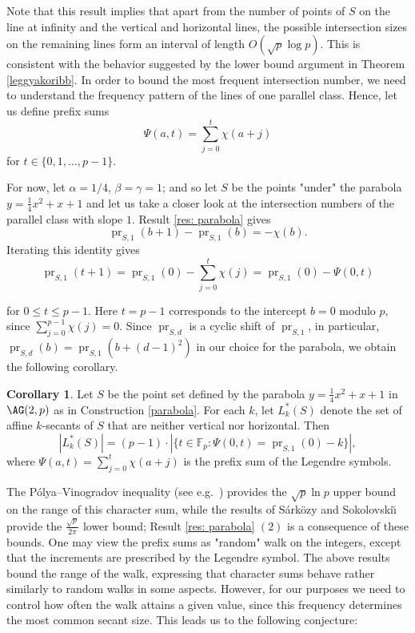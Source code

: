 \documentclass[10pt]{article}
\DeclareMathOperator{\pr}{pr}
\theoremstyle{definition}
\newtheorem{corollary}[thm]{Corollary}
\begin{document}
	Note that this result implies that apart from the number of points of $S$ on the line at infinity and the vertical and horizontal lines, the possible intersection sizes on the remaining lines form an interval of length $O(\sqrt p \log p)$. This is consistent with the behavior suggested by the lower bound argument in Theorem \ref{leggyakoribb}. In order to bound the most frequent intersection number, we need to understand the frequency pattern of the lines of one parallel class. Hence, let us define prefix sums
	\[
	\Psi(a, t) = \sum_{j=0}^t \chi(a+j)
	\] for $t\in \{0,1,\ldots, p-1\}$.
	
	
	For now, let $\alpha = 1 /4 $, $\beta = \gamma = 1$; and so let $S$ be the points "under" the parabola $y=\frac {1}{4}x^2 + x + 1$ and let us take a closer look at the intersection numbers of the parallel class with slope $1$. Result \ref{res: parabola} gives $$\pr_{S,1}(b+1)-\pr_{S,1}(b) = -\chi(b).$$ Iterating this identity gives 
	\[
	\pr_{S,1}(t+1)
	=
	\pr_{S,1}(0)-\sum_{j=0}^{t}\chi(j)
	=
	\pr_{S,1}(0)-\Psi(0,t)
	\]
	
	for \(0\leq t\leq p-1\). Here \(t=p-1\) corresponds to the intercept
	\(b=0\) modulo \(p\), since \(\sum_{j=0}^{p-1}\chi(j)=0\).
	Since $\pr_{S,d}$ is a cyclic shift of $\pr_{S,1}$, in particular, $\pr_{S,d}(b)=\pr_{S,1}(b+(d-1)^2)$ in our choice for the parabola, we obtain the following corollary.
	\begin{corollary} \label{cor:parabola_freq}
		Let $S$ be the point set defined by the parabola $y = \frac{1}{4}x^2 + x + 1$ in $\AG(2,p)$ as in Construction \ref{parabola}. 
		For each \(k\), let \(L_k^*(S)\) denote the set of affine
		\(k\)-secants of \(S\) that are neither vertical nor horizontal. Then
		$$ |L_k^*(S)| = (p-1) \cdot |\{t \in \mathbb{F}_p : \Psi(0, t) = \pr_{S,1}(0) - k\}|, $$ 
		where $\Psi(a,t) = \sum_{j=0}^{t} \chi(a+j)$ is the prefix sum of the Legendre symbols. 
	\end{corollary}
	
	The P\'olya--Vinogradov inequality (see e.g.~\cite{MontgomeryVaughan}) provides the $\sqrt p \ln p$ upper bound on the range of this character sum, while the results of S\'{a}rk\"{o}zy \cite{Sarkozy:77} and Sokolovski\u{\i} \cite{Sokolovskii:82} provide the $\frac{\sqrt p}{2 \pi}$ lower bound; Result \ref{res: parabola} $(2)$ is a consequence of these bounds. 
	One may view the prefix sums as "random" walk on the integers, except that the increments are prescribed by the Legendre symbol. 
	The above results bound the range of the walk, expressing that character sums behave rather similarly to random walks in some aspects. However, for our purposes we need to control how often the walk attains a given value, since this frequency determines the most common secant size. This leads us to the following conjecture:
	
\end{document}
